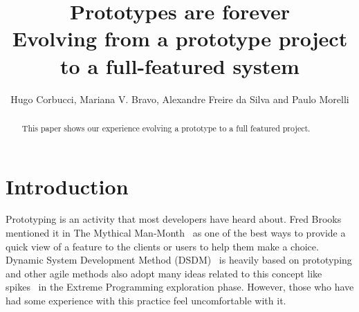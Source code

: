 \documentclass[lnbip]{svmultln}
\begin{document}
%
\mainmatter              %
%
\title{Prototypes are forever\\
  Evolving from a prototype project\\ to a full-featured system}
%
%
\author{Hugo Corbucci, Mariana V. Bravo, Alexandre Freire da Silva and Paulo Morelli}
%
%
%

\maketitle              %

\begin{abstract}        %

This paper shows our experience evolving a prototype to a full featured project.
\end{abstract}
%
\section{Introduction}

Prototyping is an activity that most developers have heard about. Fred
Brooks mentioned it in The Mythical Man-Month~\cite{Brooks1975} as one
of the best ways to provide a quick view of a feature to the clients
or users to help them make a choice. Dynamic System Development Method
(DSDM)~\cite{DSDM} is heavily based on prototyping and other agile
methods also adopt many ideas related to this concept like spikes~\cite{XP} in
the Extreme Programming exploration phase. However, those who have had some
experience with this practice feel uncomfortable with it\cite{quem disse? esse
tipo de afirmação é sempre bom ter uma citação, já apanhei bastante sobre isso.
ale}.
\end{document}
